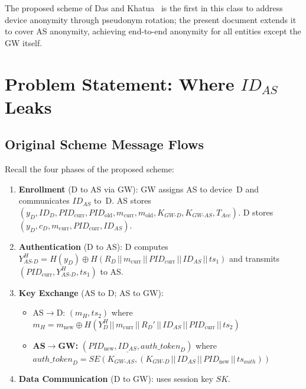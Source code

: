 \documentclass[12pt,a4paper]{article}
\newcommand{\IDd}{\mathit{ID}_D}
\newcommand{\IDas}{\mathit{ID}_{AS}}
\newcommand{\PIDcurr}{\mathit{PID}_{\mathrm{curr}}}
\newcommand{\PIDown}{\mathit{PID}_{\mathrm{old}}}
\newcommand{\PIDnew}{\mathit{PID}_{\mathrm{new}}}
\newcommand{\mcurr}{m_{\mathrm{curr}}}
\newcommand{\mold}{m_{\mathrm{old}}}
\newcommand{\mnew}{m_{\mathrm{new}}}
\newcommand{\KGWd}{K_{GW\text{-}D}}
\newcommand{\KGWas}{K_{GW\text{-}AS}}
\newcommand{\YASDhH}{Y_{AS\text{-}D}^{H}}
\newcommand{\YDH}{Y_D^{H}}
\newcommand{\SK}{\mathit{SK}}
\newcommand{\Rd}{R_D}
\newcommand{\cd}{c_D}
\newcommand{\TAcc}{T_{\mathit{Acc}}}
\newcommand{\authtoken}{\mathit{auth\_token}_D}
\newcommand{\SE}{\mathit{SE}}
\begin{document}
The proposed scheme of Das and Khatua~\cite{das2026comsnets} is the
first in this class to address device anonymity through pseudonym
rotation; the present document extends it to cover AS anonymity,
achieving end-to-end anonymity for all entities except the GW itself.

\section{Problem Statement: Where \texorpdfstring{$\IDas$}{ID\_AS} Leaks}

\subsection{Original Scheme Message Flows}

Recall the four phases of the proposed scheme:
\begin{enumerate}
  \item \textbf{Enrollment} (D to AS via GW):
        GW assigns AS to device~D and communicates $\IDas$ to~D.
        AS stores $(y_D, \IDd, \PIDcurr, \PIDown, \mcurr, \mold,
        \KGWd, \KGWas, \TAcc)$.
        D stores $(y_D, \cd, \mcurr, \PIDcurr, \IDas)$.

  \item \textbf{Authentication} (D to AS):
        D computes
        $\YASDhH = H(y_D) \oplus H(\Rd \,||\, \mcurr \,||\, \PIDcurr
        \,||\, \IDas \,||\, ts_1)$
        and transmits $(\PIDcurr, \YASDhH, ts_1)$ to AS.

  \item \textbf{Key Exchange} (AS to D; AS to GW):
        \begin{itemize}
          \item AS$\to$D: $(m_H, ts_2)$ where
                $m_H = \mnew \oplus H(\YDH \,||\, \mcurr \,||\, \Rd' \,||\,
                \IDas \,||\, \PIDcurr \,||\, ts_2)$
          \item \textbf{AS$\to$GW:}
                $(\PIDnew, \underline{\IDas}, \authtoken)$
                where $\authtoken = \SE(\KGWas, (\KGWd \,||\, \IDas \,||\,
                \PIDnew \,||\, ts_{\mathit{auth}}))$
        \end{itemize}

  \item \textbf{Data Communication} (D to GW): uses session key $\SK$.
\end{enumerate}
\end{document}
